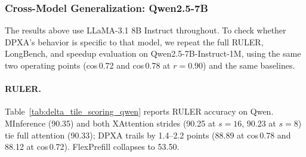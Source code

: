 \begin{table}[!ht]
\centering
\small
\caption{LongBench scores on LLaMA-3.1 8B Instruct (100 samples per task) for the DPXA cosine-threshold sweep, all at recall $r{=}0.90$. Task abbreviations as in Table~\ref{tab:longbench}.}
\label{tab:cos_longbench}
\end{table}

\subsubsection{Cross-Model Generalization: Qwen2.5-7B}
\label{sec:results_qwen}

The results above use LLaMA-3.1 8B Instruct throughout. To check whether DPXA's behavior is specific to that model, we repeat the full RULER, LongBench, and speedup evaluation on Qwen2.5-7B-Instruct-1M, using the same two operating points (cos\,0.72 and cos\,0.78 at $r{=}0.90$) and the same baselines.


\paragraph{RULER.}

Table~\ref{tab:delta_tile_scoring_qwen} reports RULER accuracy on Qwen. MInference (90.35) and both XAttention strides (90.25 at $s{=}16$, 90.23 at $s{=}8$) tie full attention (90.33); DPXA trails by 1.4--2.2 points (88.89 at cos\,0.78 and 88.12 at cos\,0.72). FlexPrefill collapses to 53.50.

